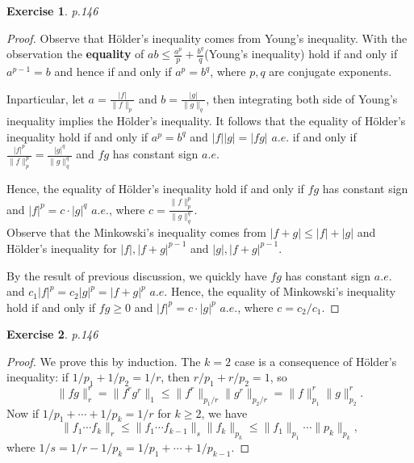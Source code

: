 \documentclass[11pt,a4paper]{article}
\renewcommand{\(}{\left(}
\renewcommand{\)}{\right)}
\renewcommand{\[}{\left[}
\renewcommand{\]}{\right]}
\newtheorem{exercise}{Exercise}
\begin{document}
  \setcounter{exercise}{3}
  \begin{exercise}
  	p.146
  \end{exercise}
  \begin{proof}
  	Observe that H\"older's inequality comes from Young's inequality. With the observation the \textbf{equality} of $ab\le \frac{a^p}{p}+\frac{b^q}{q}$(Young's inequality) hold if and only if $a^{p-1}=b$ and hence if and only if $a^p=b^q$, where $p,q$ are conjugate exponents.
  	
  	Inparticular, let $a=\frac{|f|}{\|f\|_p}$ and $b=\frac{|g|}{\|g\|_q}$, then integrating both side of Young's inequality implies the H\"older's inequality. It follows that the equality of H\"older's inequality hold if and only if $a^p = b^q$  and $|f||g|=|fg|$ $a.e.$ if and only if $\frac{|f|^p}{\|f\|_p^p}=\frac{|g|^q}{\|g\|_q^q}$ and $fg$ has constant sign $a.e.$ 
  	
  	Hence, the equality of H\"older's inequality hold if and only if $fg$ has constant sign and $|f|^p=c\cdot |g|^q$ $a.e.$, where $c=\frac{\|f\|_p^p}{\|g\|_q^q}$.\\
  	
  	Observe that the Minkowski's inequality comes from $|f+g|\le|f|+|g|$ and H\"older's inequality for $|f|,|f+g|^{p-1}$ and $|g|,|f+g|^{p-1}$. 
  	
  	By the result of previous discussion, we quickly have $fg$ has constant sign $a.e.$ and $c_1|f|^p = c_2|g|^p = |f+g|^{p}$ $a.e.$ Hence, the equality of Minkowski's inequality hold if and only if $fg\ge 0$ and $|f|^p = c\cdot|g|^p$ $a.e.$, where $c = c_2/c_1$.
  \end{proof}
  
  \setcounter{exercise}{5}
  \begin{exercise}
  	p.146
  \end{exercise}
  \begin{proof}
  	We prove this by induction. The $k=2$  case is a consequence of H\"older's inequality: if $1/p_1 + 1/p_2 = 1/r$, then $r/p_1 + r/p_2 = 1$, so 
  	$$
  	\|fg\|_r^r = \|f^rg^r\|_1\le \|f^r\|_{p_1/r}\|g^r\|_{p_2/r} = \|f\|_{p_1}^r\|g\|_{p_2}^r.
  	$$
  	Now if $1/p_1+\cdots +1/p_k = 1/r$ for $k\ge 2$, we have
  	$$
  	\|f_1\cdots f_k\|_r\le \|f_1\cdots f_{k-1}\|_s\|f_k\|_{p_k}\le \|f_1\|_{p_1}\cdots\|p_k\|_{p_k},
  	$$
  	where $1/s = 1/r-1/p_k = 1/p_1 +\cdots +1/p_{k-1}$.
  \end{proof}
\end{document}
